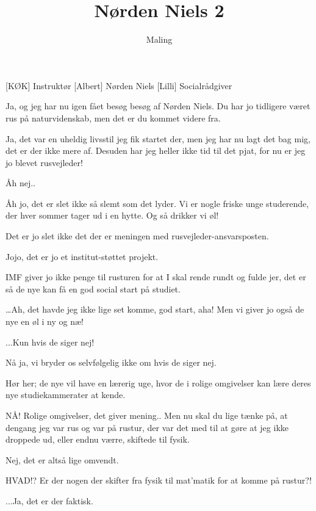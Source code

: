 \documentclass[a4paper,11pt]{article}
\title{Nørden Niels 2}
\author{Maling}
\begin{document}
\maketitle

\begin{roles}
[KØK] Instruktør
[Albert] Nørden Niels
[Lilli] Socialrådgiver
\end{roles}

\begin{sketch}
 Ja, og jeg har nu igen fået besøg besøg af Nørden Niels. Du har jo tidligere været rus på naturvidenskab, men det er du kommet videre fra.

 Ja, det var en uheldig livsstil jeg fik startet der, men jeg har nu lagt det bag mig, det er der ikke mere af. Desuden har jeg heller ikke tid til det pjat, for nu er jeg jo blevet rusvejleder!

 Åh nej..

 Åh jo, det er slet ikke så slemt som det lyder. Vi er nogle friske unge studerende, der hver sommer tager ud i en hytte. Og så drikker vi øl!

 Det er jo slet ikke det der er meningen med rusvejleder-ansvarsposten.

 Jojo, det er jo et institut-støttet projekt.

 IMF giver jo ikke penge til rusturen for at I skal rende rundt og fulde jer, det er så de nye kan få en god social start på studiet.

 …Ah, det havde jeg ikke lige set komme, god start, aha! Men vi giver jo også de nye en øl i ny og næ!

 ...Kun hvis de siger nej!

 Nå ja, vi bryder os selvfølgelig ikke om hvis de siger nej.

 Hør her; de nye vil have en lærerig uge, hvor de i rolige omgivelser kan lære deres nye studiekammerater at kende.

 NÅ! Rolige omgivelser, det giver mening.. Men nu skal du lige tænke på, at dengang jeg var rus og var på rustur, der var det med til at gøre at jeg ikke droppede ud, eller endnu værre, skiftede til fysik.

 Nej, det er altså lige omvendt.

 HVAD!? Er der nogen der skifter fra fysik til mat’matik for at komme på rustur?!

 ...Ja, det er der faktisk.


\end{sketch}
\end{document}
